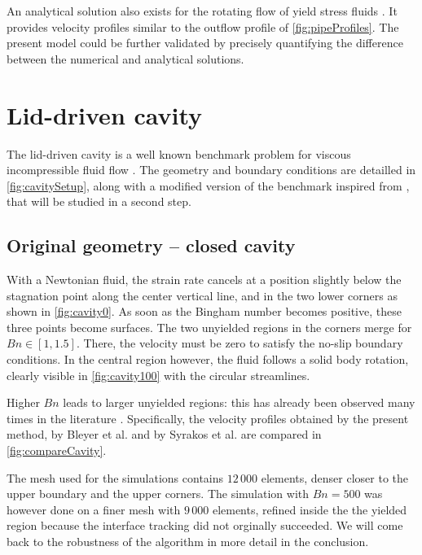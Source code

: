 \documentclass[11 pt]{report}
\begin{document}
An analytical solution also exists for the rotating flow of yield stress fluids \cite{circularProfile}. It provides velocity profiles similar to the outflow profile of \cref{fig:pipeProfiles}. The present model could be further validated by precisely quantifying the difference between the numerical and analytical solutions.

\pagebreak
\section{Lid-driven cavity}

The lid-driven cavity is a well known benchmark problem for viscous incompressible fluid flow \cite{FEMfluid}. The geometry and boundary conditions are detailled in \cref{fig:cavitySetup}, along with a modified version of the benchmark inspired from \cite{hoffmann}, that will be studied in a second step.



\subsection{Original geometry -- closed cavity}

With a Newtonian fluid, the strain rate cancels at a position slightly below the stagnation point along the center vertical line, and in the two lower corners as shown in \cref{fig:cavity0}. As soon as the Bingham number becomes positive, these three points become surfaces. The two unyielded regions in the corners merge for $Bn\in[1,1.5]$. There, the velocity must be zero to satisfy the no-slip boundary conditions. In the central region however, the fluid follows a solid body rotation, clearly visible in \cref{fig:cavity100} with the circular streamlines.

Higher $Bn$ leads to larger unyielded regions: this has already been observed many times in the literature \cite{Bleyer,Syrakos,Treskatis}. Specifically, the velocity profiles obtained by the present method, by Bleyer et al. \cite{Bleyer} and by Syrakos et al. \cite{Syrakos} are compared in \cref{fig:compareCavity}. 

The mesh used for the simulations contains $12\,000$ elements, denser closer to the upper boundary and the upper corners. The simulation with $Bn=500$ was however done on a finer mesh with $9\,000$ elements, refined inside the the yielded region because the interface tracking did not orginally succeeded. We will come back to the robustness of the algorithm in more detail in the conclusion.
\end{document}
